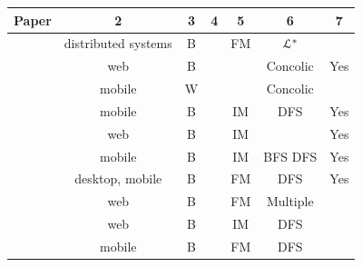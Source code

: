 \begin{table}
	\begin{tabular}{| c | c | c | c | c | c | c |}

		\hline

		Paper &2& 3 & 4& 5 & 6 & 7 	\\
		\hline


		\cite{hungar2002}                       &distributed
        systems   &B  &  &FM&$\EuScript{L}^*$       & \\


		\cite{5416728}                          &web                    &B  &  &  &Concolic & Yes \\

		\cite{concolicandroid12}                &mobile                 &W  &  &  &Concolic & 					\\

		\cite{Joorabchi:2012:REI:2420240.2420457}                    &mobile                 &B  &  &IM &DFS		& Yes 			 		\\

		\cite{webmate12}                        &web                    &B  &  &IM &         & Yes \\


		\cite{5954416,Amalfitano:2012:UGR:2351676.2351717}     &mobile                 &B  &  &IM &BFS DFS 	& Yes	\\

		\cite{guitar,MobiGUITARIEEESoftware2014}          &desktop, mobile        &B	&  &FM &DFS		& Yes  \\

		\cite{crawljax:tweb12}                  &web                    &B	&  &FM&Multiple &	\\

		\cite{4656395}                          &web                    &B 	&  &IM &DFS 		&   \\

		\cite{Choi2013}                         &mobile                 &B  &  &FM&DFS      &   \\


\end{tabular}
\end{table}
